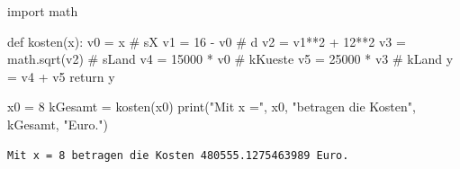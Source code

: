 \documentclass[
  a4paper,
  DIV=11]{scrreprt}
\newenvironment{Shaded}{\begin{snugshade}}{\end{snugshade}}
\newcommand{\BuiltInTok}[1]{\textcolor[rgb]{0.00,0.23,0.31}{#1}}
\newcommand{\CommentTok}[1]{\textcolor[rgb]{0.37,0.37,0.37}{#1}}
\newcommand{\ControlFlowTok}[1]{\textcolor[rgb]{0.00,0.23,0.31}{#1}}
\newcommand{\DecValTok}[1]{\textcolor[rgb]{0.68,0.00,0.00}{#1}}
\newcommand{\ImportTok}[1]{\textcolor[rgb]{0.00,0.46,0.62}{#1}}
\newcommand{\KeywordTok}[1]{\textcolor[rgb]{0.00,0.23,0.31}{#1}}
\newcommand{\NormalTok}[1]{\textcolor[rgb]{0.00,0.23,0.31}{#1}}
\newcommand{\OperatorTok}[1]{\textcolor[rgb]{0.37,0.37,0.37}{#1}}
\newcommand{\StringTok}[1]{\textcolor[rgb]{0.13,0.47,0.30}{#1}}
\theoremstyle{definition}
\theoremstyle{definition}
\theoremstyle{remark}
\begin{document}
\begin{tcolorbox}[enhanced jigsaw, titlerule=0mm, title=\textcolor{quarto-callout-tip-color}{\faLightbulb}\hspace{0.5em}{Lösung}, breakable, coltitle=black, leftrule=.75mm, bottomrule=.15mm, colback=white, rightrule=.15mm, opacitybacktitle=0.6, bottomtitle=1mm, toptitle=1mm, left=2mm, toprule=.15mm, colbacktitle=quarto-callout-tip-color!10!white, colframe=quarto-callout-tip-color-frame, arc=.35mm, opacityback=0]

\begin{Shaded}
\begin{Highlighting}[]
\ImportTok{import}\NormalTok{ math}

\KeywordTok{def}\NormalTok{ kosten(x):}
\NormalTok{    v0 }\OperatorTok{=}\NormalTok{ x       }\CommentTok{\# sX}
\NormalTok{    v1 }\OperatorTok{=} \DecValTok{16} \OperatorTok{{-}}\NormalTok{ v0 }\CommentTok{\# d}
\NormalTok{    v2 }\OperatorTok{=}\NormalTok{ v1}\OperatorTok{**}\DecValTok{2} \OperatorTok{+} \DecValTok{12}\OperatorTok{**}\DecValTok{2}
\NormalTok{    v3 }\OperatorTok{=}\NormalTok{ math.sqrt(v2) }\CommentTok{\# sLand}
\NormalTok{    v4 }\OperatorTok{=} \DecValTok{15000} \OperatorTok{*}\NormalTok{ v0 }\CommentTok{\# kKueste}
\NormalTok{    v5 }\OperatorTok{=} \DecValTok{25000} \OperatorTok{*}\NormalTok{ v3 }\CommentTok{\# kLand}
\NormalTok{    y }\OperatorTok{=}\NormalTok{ v4 }\OperatorTok{+}\NormalTok{ v5}
    \ControlFlowTok{return}\NormalTok{ y}
    
\NormalTok{x0 }\OperatorTok{=} \DecValTok{8}
\NormalTok{kGesamt }\OperatorTok{=}\NormalTok{ kosten(x0)}
\BuiltInTok{print}\NormalTok{(}\StringTok{"Mit x ="}\NormalTok{, x0, }\StringTok{"betragen die Kosten"}\NormalTok{, kGesamt, }\StringTok{"Euro."}\NormalTok{)}
\end{Highlighting}
\end{Shaded}

\begin{verbatim}
Mit x = 8 betragen die Kosten 480555.1275463989 Euro.
\end{verbatim}

\end{tcolorbox}
\end{document}
